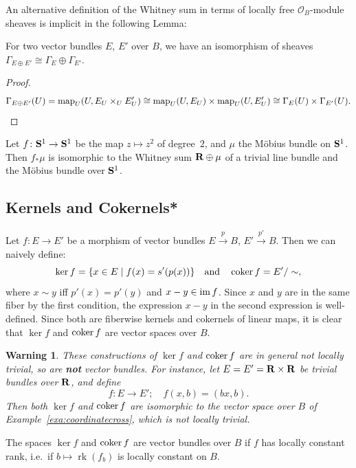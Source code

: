 \documentclass[a4paper,openany]{scrbook}
\DeclareMathOperator{\rk}{rk}
\newtheorem{warning}[equation]{Warning}
\begin{document}
An alternative definition of the Whitney sum in terms of locally free $\mathcal O_B$-module sheaves is implicit in the following Lemma:

\begin{lemma}
For two vector bundles $E$, $E'$ over $B$, we have an isomorphism of sheaves $\Gamma_{E \oplus E'} \cong \Gamma_E \oplus \Gamma_{E'}$.
\end{lemma}
\begin{proof}
\[
\Gamma_{E \oplus E'}(U) = \map_U(U,E_U \times_U E'_U) \cong \map_U(U,E_U) \times \map_U(U,E'_U) \cong \Gamma_E(U) \times \Gamma_{E'}(U).
\]
\end{proof}

\begin{exer}
Let $f\colon \S^1 \to \S^1$ be the map $z \mapsto z^2$ of degree~$2$, and $\mu$ the Möbius bundle on $\S^1$. Then $f_*\mu$ is isomorphic to the Whitney sum $\R \oplus \mu$ of a trivial line bundle and the Möbius bundle over $\S^1$.
\end{exer}

\subsection{Kernels and Cokernels*}

Let $f\colon E \to E'$ be a morphism of vector bundles $E \xrightarrow{p} B$, $E' \xrightarrow{p'} B$. Then we can naively define:
\[
\ker f = \{x \in E \mid f(x)=s'(p(x))\} \quad \text{and} \quad \coker f = E'/\sim,
\]
where $x \sim y$ iff $p'(x) = p'(y)$ and $x-y \in \im f$. Since $x$ and $y$ are in the same fiber by the first condition, the expression $x-y$ in the second expression is well-defined. Since both are fiberwise kernels and cokernels of linear maps, it is clear that $\ker f$ and $\coker f$ are vector spaces over $B$.

\begin{warning}
These constructions of $\ker f$ and $\coker f$ are in general not locally trivial, so are \textbf{not} vector bundles. For instance, let $E=E'=\R\times \R$ be trivial bundles over $\R$, and define
\[
f\colon E \to E'; \quad f(x,b) = (bx,b).
\]
Then both $\ker f$ and $\coker f$ are isomorphic to the vector space over $B$ of Example~\ref{exa:coordinatecross}, which is not locally trivial.
\end{warning}


\begin{exer}
The spaces $\ker f$ and $\coker f$ are vector bundles over $B$ if $f$ has locally constant rank, i.e.\ if $b \mapsto \rk(f_b)$ is locally constant on $B$.
\end{exer}
\end{document}
